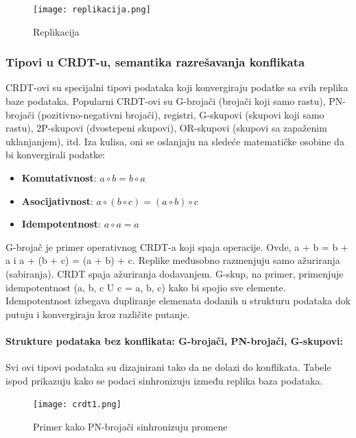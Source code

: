 \documentclass[12pt]{article}
\begin{document}
\begin{figure}[H]
	\centering
	\texttt{[image: replikacija.png]}
	\caption{Replikacija}
	\label{fig:nls_demo}
\end{figure}
    
\subsubsection{Tipovi u CRDT-u, semantika razrešavanja konflikata}

CRDT-ovi su specijalni tipovi podataka koji konvergiraju podatke sa svih replika baze podataka. Popularni CRDT-ovi su G-brojači (brojači koji samo rastu), PN-brojači (pozitivno-negativni brojači), registri, G-skupovi (skupovi koji samo rastu), 2P-skupovi (dvostepeni skupovi), OR-skupovi (skupovi sa zapaženim uklanjanjem), itd. Iza kulisa, oni se oslanjaju na sledeće matematičke osobine da bi konvergirali podatke:

\begin{itemize}
	\item \textbf{Komutativnost}: $a \circ b = b \circ a $
	\item \textbf{Asocijativnost}: $a \circ (b \circ c) = (a \circ b) \circ c $
	\item \textbf{Idempotentnost}: $a \circ a = a $
\end{itemize}
    
G-brojač je primer operativnog CRDT-a koji spaja operacije. Ovde, a + b = b + a i a + (b + c) = (a + b) + c. Replike međusobno razmenjuju samo ažuriranja (sabiranja). CRDT spaja ažuriranja dodavanjem. G-skup, na primer, primenjuje idempotentnost ({a, b, c} U {c} = {a, b, c}) kako bi spojio sve elemente. Idempotentnost izbegava dupliranje elemenata dodanih u strukturu podataka dok putuju i konvergiraju kroz različite putanje.

\paragraph{Strukture podataka bez konflikata: G-brojači, PN-brojači, G-skupovi:}

Svi ovi tipovi podataka su dizajnirani tako da ne dolazi do konflikata. Tabele ispod prikazuju kako se podaci sinhronizuju između replika baza podataka. 

\begin{figure}[H]
	\centering
	\texttt{[image: crdt1.png]}
	\caption{Primer kako PN-brojači sinhronizuju promene}
	\label{fig:nls_demo}
\end{figure}
\end{document}
